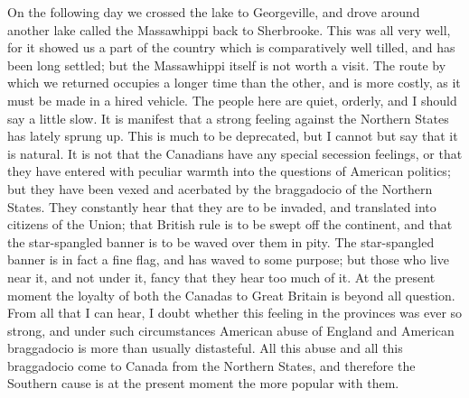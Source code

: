 On the following day we crossed the lake to Georgeville, and drove
around another lake called the Massawhippi back to Sherbrooke.
This was all very well, for it showed us a part of the country
which is comparatively well tilled, and has been long settled; but
the Massawhippi itself is not worth a visit.  The route by which we
returned occupies a longer time than the other, and is more costly,
as it must be made in a hired vehicle.  The people here are quiet,
orderly, and I should say a little slow.  It is manifest that a
strong feeling against the Northern States has lately sprung up.
This is much to be deprecated, but I cannot but say that it is
natural.  It is not that the Canadians have any special secession
feelings, or that they have entered with peculiar warmth into the
questions of American politics; but they have been vexed and
acerbated by the braggadocio of the Northern States.  They
constantly hear that they are to be invaded, and translated into
citizens of the Union; that British rule is to be swept off the
continent, and that the star-spangled banner is to be waved over
them in pity.  The star-spangled banner is in fact a fine flag, and
has waved to some purpose; but those who live near it, and not
under it, fancy that they hear too much of it.  At the present
moment the loyalty of both the Canadas to Great Britain is beyond
all question.  From all that I can hear, I doubt whether this
feeling in the provinces was ever so strong, and under such
circumstances American abuse of England and American braggadocio is
more than usually distasteful.  All this abuse and all this
braggadocio come to Canada from the Northern States, and therefore
the Southern cause is at the present moment the more popular with
them.

